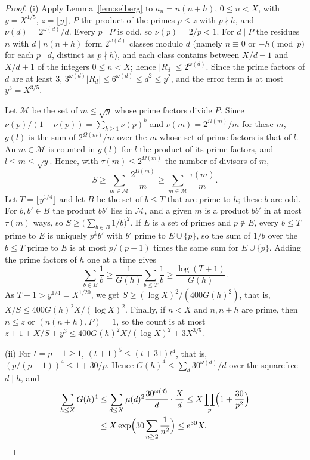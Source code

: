 \documentclass[12pt]{amsart}
\numberwithin{equation}{section}
\theoremstyle{definition}
\begin{document}
\begin{proof}
(i) Apply Lemma~\ref{lem:selberg} to $a_n=n(n+h)$, $0\le n<X$, with $y=X^{1/5}$,
$z=\lfloor y\rfloor$, $P$ the product of the primes $p\le z$ with $p\nmid h$, and
$\nu(d)=2^{\omega(d)}/d$. Every $p\mid P$ is odd, so $\nu(p)=2/p<1$. For $d\mid P$ the residues $n$
with $d\mid n(n+h)$ form $2^{\omega(d)}$ classes modulo $d$ (namely $n\equiv0$ or $-h\pmod p$ for
each $p\mid d$, distinct as $p\nmid h$), and each class contains between $X/d-1$ and $X/d+1$ of
the integers $0\le n<X$; hence $|R_d|\le2^{\omega(d)}$. Since the prime factors of $d$ are at
least $3$, $3^{\omega(d)}|R_d|\le6^{\omega(d)}\le d^2\le y^2$, and the error term is at most
$y^3=X^{3/5}$.

Let $\mathcal M$ be the set of $m\le\sqrt y$ whose prime factors divide $P$. Since
$\nu(p)/(1-\nu(p))=\sum_{k\ge1}\nu(p)^k$ and $\nu(m)=2^{\Omega(m)}/m$ for these $m$, $g(l)$ is the
sum of $2^{\Omega(m)}/m$ over the $m$ whose set of prime factors is that of $l$. An $m\in\mathcal M$
is counted in $g(l)$ for $l$ the product of its prime factors, and $l\le m\le\sqrt y$. Hence,
with $\tau(m)\le2^{\Omega(m)}$ the number of divisors of $m$,
\[
  S\ge\sum_{m\in\mathcal M}\frac{2^{\Omega(m)}}m\ge\sum_{m\in\mathcal M}\frac{\tau(m)}m.
\]
Let $T=\lfloor y^{1/4}\rfloor$ and let $B$ be
the set of $b\le T$ that are prime to $h$; these $b$ are odd. For $b,b'\in B$ the product $bb'$
lies in $\mathcal M$, and a given $m$ is a product $bb'$ in at most $\tau(m)$ ways, so
$S\ge\bigl(\sum_{b\in B}1/b\bigr)^2$. If $E$ is a set of primes and $p\notin E$, every $b\le T$
prime to $E$ is uniquely $p^kb'$ with $b'$ prime to $E\cup\{p\}$, so the sum of $1/b$ over the
$b\le T$ prime to $E$ is at most $p/(p-1)$ times the same sum for $E\cup\{p\}$. Adding the prime
factors of $h$ one at a time gives
\[
  \sum_{b\in B}\frac1b\ge\frac1{G(h)}\sum_{b\le T}\frac1b\ge\frac{\log(T+1)}{G(h)}.
\]
As $T+1>y^{1/4}=X^{1/20}$, we get $S\ge(\log X)^2/(400G(h)^2)$, that is,
$X/S\le400G(h)^2X/(\log X)^2$. Finally, if $n<X$ and $n,n+h$ are prime, then $n\le z$ or
$(n(n+h),P)=1$, so the count is at most $z+1+X/S+y^3\le400G(h)^2X/(\log X)^2+3X^{3/5}$.

(ii) For $t=p-1\ge1$, $(t+1)^5\le(t+31)t^4$, that is, $(p/(p-1))^4\le1+30/p$. Hence
$G(h)^4\le\sum_d30^{\omega(d)}/d$ over the squarefree $d\mid h$, and
\begin{align*}
  \sum_{h\le X}G(h)^4&\le\sum_{d\le X}\mu(d)^2\frac{30^{\omega(d)}}d\cdot\frac Xd
  \le X\prod_p\Bigl(1+\frac{30}{p^2}\Bigr)\\
  &\le X\exp\Bigl(30\sum_{n\ge2}\frac1{n^2}\Bigr)\le e^{30}X.\qedhere
\end{align*}
\end{proof}
\end{document}
